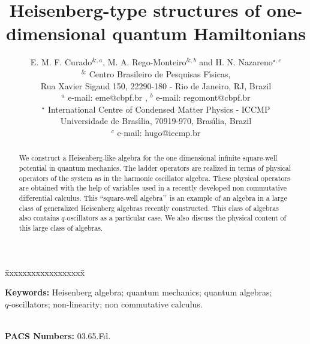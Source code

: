 \documentclass[a4paper,12pt]{article}
\begin{document}
 


\title{
{\Large \bf Heisenberg-type  structures of one-dimensional 
quantum Hamiltonians  }
}

\author{
E. M. F. Curado$^{\&,a}$, M. A. Rego-Monteiro$^{\&,b}$ and H. N. Nazareno$^{\star,c}$ \\
$^{\&}$ Centro Brasileiro de Pesquisas F\'\i sicas, \\ 
Rua Xavier Sigaud 150, 22290-180 - Rio de Janeiro, RJ, Brazil \\
$^{a}$ e-mail: eme@cbpf.br ,
$^{b}$ e-mail: regomont@cbpf.br \\
$^{\star}$ International Centre of Condensed Matter Physics - ICCMP \\
Universidade de Bras\'{\i}lia, 70919-970, Bras\'{\i}lia, Brazil \\
$^{c}$ e-mail: hugo@iccmp.br
}

\maketitle

\begin{abstract}
 
\indent
 
We construct a Heisenberg-like algebra
for the one dimensional infinite square-well 
potential in quantum mechanics. The  ladder 
operators
are realized in terms of physical operators of the
system as in the harmonic oscillator algebra.
These physical operators are
obtained with the help of variables used in a 
recently developed non commutative differential 
calculus.  
This \textquotedblleft square-well algebra\textquotedblright \,  
is an example of an algebra in a large class of 
generalized Heisenberg algebras recently constructed. 
This class of algebras also contains $q$-oscillators as a
particular case.
We also discuss the physical content of this large 
class of algebras. 



\end{abstract}

\vspace{1cm}



\begin{tabbing}

\=xxxxxxxxxxxxxxxxxx\= \kill

{\bf Keywords:}  Heisenberg algebra; quantum mechanics;
quantum algebras;\\ $q$-oscillators; non-linearity;  
non commutative calculus. 

 \\

{\bf PACS Numbers:} 03.65.Fd.

\end{tabbing}
\end{document}

